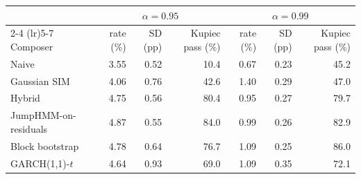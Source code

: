 \begin{tabular}{lrrrrrr}
\toprule
 & \multicolumn{3}{c}{$\alpha = 0.95$} & \multicolumn{3}{c}{$\alpha = 0.99$} \\
\cmidrule(lr){2-4} \cmidrule(lr){5-7}
Composer & rate (\%) & SD (pp) & Kupiec pass (\%) & rate (\%) & SD (pp) & Kupiec pass (\%) \\
\midrule
Naive                  & 3.55 & 0.52 & 10.4 & 0.67 & 0.23 & 45.2 \\
Gaussian SIM           & 4.06 & 0.76 & 42.6 & 1.40 & 0.29 & 47.0 \\
Hybrid                 & 4.75 & 0.56 & 80.4 & 0.95 & 0.27 & 79.7 \\
JumpHMM-on-residuals   & 4.87 & 0.55 & 84.0 & 0.99 & 0.26 & 82.9 \\
Block bootstrap        & 4.78 & 0.64 & 76.7 & 1.09 & 0.25 & 86.0 \\
GARCH(1,1)-$t$         & 4.64 & 0.93 & 69.0 & 1.09 & 0.35 & 72.1 \\
\bottomrule
\end{tabular}
